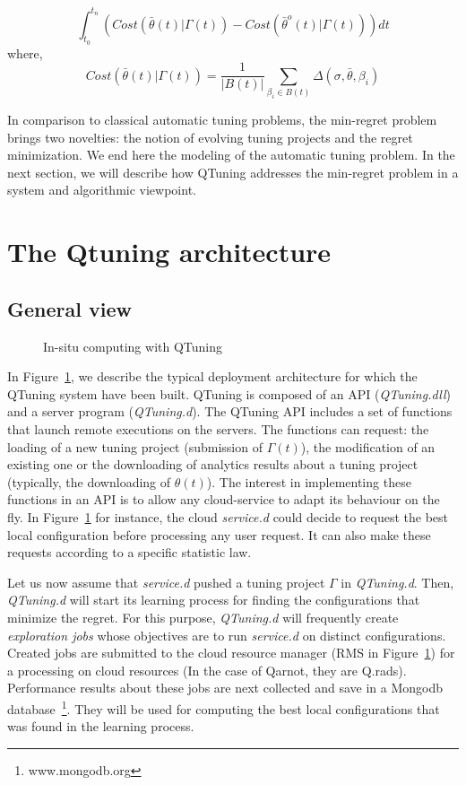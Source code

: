 \documentclass[10pt, conference, compsocconf]{IEEEtran}
\begin{document}
\[
\int_{t_0}^{t_n} \left( Cost(\bar{\theta}(t)| \Gamma(t)) - Cost(\bar{\theta}^o(t) | \Gamma(t)) \right) dt
\]
where, 
\[
Cost(\bar{\theta}(t) | \Gamma(t)) = \frac{1}{|B(t)|}\sum_{\beta_i \in B(t)} \Delta(\sigma, \bar{\theta}, \beta_i) 
\]


In comparison to classical automatic tuning problems, the min-regret problem brings two novelties: 
the notion of evolving tuning projects and the regret minimization. 
We end here the modeling of the automatic tuning problem. In the next section, we will describe how 
QTuning addresses the min-regret problem in a system and algorithmic viewpoint.

\section{The Qtuning architecture} \label{Architecture}

\subsection{General view}

	\begin{figure}[hbtp]
	\begin{center}
	
	\caption{In-situ computing with QTuning}
	\label{fig:QTuning}
	\end{center}
	\end{figure}


In Figure~\ref{fig:QTuning}, we describe the typical deployment architecture for which the 
QTuning system have been built. QTuning is composed of an API ({\it QTuning.dll}) and 
a server program ({\it QTuning.d}). The QTuning API includes a set of functions that 
launch remote executions on the servers. The functions can request: the loading of a new tuning project (submission of 
$\Gamma(t)$), the modification of an existing one or the downloading of analytics results about a tuning project 
(typically, the downloading of $\theta(t)$). The interest in implementing these functions in an API is 
to allow any cloud-service to adapt its behaviour on the fly. In Figure~\ref{fig:QTuning} for instance,  
the cloud {\it service.d} could decide to request the best local configuration before processing any user request. 
It can also make these requests according to a specific statistic law.

Let us now assume that {\it service.d} pushed a tuning project $\Gamma$ in  {\it QTuning.d}. Then, 
{\it QTuning.d} will start its  learning process for finding the configurations that minimize the regret. 
For this purpose, {\it QTuning.d} will frequently create {\it exploration jobs} whose objectives are to run 
 {\it service.d} on distinct configurations. Created jobs are submitted to the cloud resource manager (RMS in 
Figure~\ref{fig:QTuning}) for a processing on cloud resources (In the case of Qarnot, they are Q.rads). 
Performance results about these jobs are next collected and save in a Mongodb database~\footnote{www.mongodb.org}. 
They will be used for computing the best local configurations that was found in the learning process.
\end{document}

